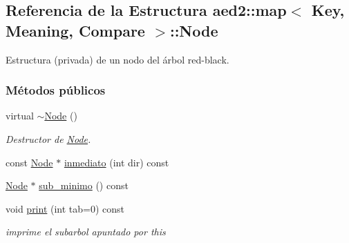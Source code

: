 \hypertarget{structaed2_1_1map_1_1Node}{}\subsection{Referencia de la Estructura aed2\+:\+:map$<$ Key, Meaning, Compare $>$\+:\+:Node}
\label{structaed2_1_1map_1_1Node}


Estructura (privada) de un nodo del árbol red-\/black.  


\subsubsection*{Métodos públicos}
\begin{DoxyCompactItemize}
\item 
virtual \hyperlink{structaed2_1_1map_1_1Node_a4f3cb2cc4302fe96432e624ced147540_a4f3cb2cc4302fe96432e624ced147540}{$\sim$\+Node} ()
\begin{DoxyCompactList}\small\item\em Destructor de \hyperlink{structaed2_1_1map_1_1Node}{Node}. \end{DoxyCompactList}\item 
const \hyperlink{structaed2_1_1map_1_1Node}{Node} $\ast$ \hyperlink{structaed2_1_1map_1_1Node_af812885685c8c3285136d444d5169b28_af812885685c8c3285136d444d5169b28}{inmediato} (int dir) const
\item 
\hyperlink{structaed2_1_1map_1_1Node}{Node} $\ast$ \hyperlink{structaed2_1_1map_1_1Node_a0457bc1ad6576f02057d9e9996cc3e5d_a0457bc1ad6576f02057d9e9996cc3e5d}{sub\+\_\+minimo} () const
\item 
void \hyperlink{structaed2_1_1map_1_1Node_a26f1400bc53e5ac9a5b3ad6250a4f832_a26f1400bc53e5ac9a5b3ad6250a4f832}{print} (int tab=0) const
\begin{DoxyCompactList}\small\item\em imprime el subarbol apuntado por this \end{DoxyCompactList}\end{DoxyCompactItemize}
